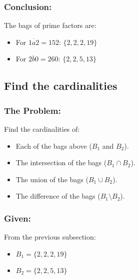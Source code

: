 \documentclass[12pt, a4paper, twoside]{report} %
\begin{document}
\subsubsection*{Conclusion:}
The bags of prime factors are:
\begin{itemize}
  \item For \(\overline{1a2} = 152\): \( \{2, 2, 2, 19\} \)
  \item For \(\overline{2b0} = 260\): \( \{2, 2, 5, 13\} \)
\end{itemize}

\subsection{Find the cardinalities}

\subsubsection*{The Problem:}
Find the cardinalities of:
\begin{itemize}
  \item Each of the bags above (\( B_1 \) and \( B_2 \)).
  \item The intersection of the bags (\( B_1 \cap B_2 \)).
  \item The union of the bags (\( B_1 \cup B_2 \)).
  \item The difference of the bags (\( B_1 \setminus B_2 \)).
\end{itemize}

\subsubsection*{Given:}
From the previous subsection:
\begin{itemize}
  \item \( B_1 = \{2, 2, 2, 19\} \)
  \item \( B_2 = \{2, 2, 5, 13\} \)
\end{itemize}
\end{document}
